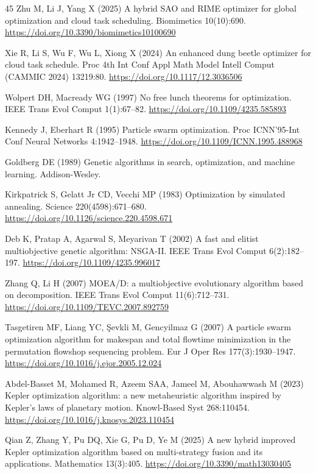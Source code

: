 \documentclass[pdflatex,onecolumn,sn-mathphys-num]{sn-jnl}
\begin{document}
\begin{thebibliography}{45}
Zhu M, Li J, Yang X (2025) A hybrid SAO and RIME optimizer for global optimization and cloud task scheduling. Biomimetics 10(10):690. \url{https://doi.org/10.3390/biomimetics10100690}

Xie R, Li S, Wu F, Wu L, Xiong X (2024) An enhanced dung beetle optimizer for cloud task schedule. Proc 4th Int Conf Appl Math Model Intell Comput (CAMMIC 2024) 13219:80. \url{https://doi.org/10.1117/12.3036506}

Wolpert DH, Macready WG (1997) No free lunch theorems for optimization. IEEE Trans Evol Comput 1(1):67--82. \url{https://doi.org/10.1109/4235.585893}

Kennedy J, Eberhart R (1995) Particle swarm optimization. Proc ICNN'95-Int Conf Neural Networks 4:1942--1948. \url{https://doi.org/10.1109/ICNN.1995.488968}

Goldberg DE (1989) Genetic algorithms in search, optimization, and machine learning. Addison-Wesley.

Kirkpatrick S, Gelatt Jr CD, Vecchi MP (1983) Optimization by simulated annealing. Science 220(4598):671--680. \url{https://doi.org/10.1126/science.220.4598.671}

Deb K, Pratap A, Agarwal S, Meyarivan T (2002) A fast and elitist multiobjective genetic algorithm: NSGA-II. IEEE Trans Evol Comput 6(2):182--197. \url{https://doi.org/10.1109/4235.996017}

Zhang Q, Li H (2007) MOEA/D: a multiobjective evolutionary algorithm based on decomposition. IEEE Trans Evol Comput 11(6):712--731. \url{https://doi.org/10.1109/TEVC.2007.892759}

Tasgetiren MF, Liang YC, \c{S}evkli M, Gencyilmaz G (2007) A particle swarm optimization algorithm for makespan and total flowtime minimization in the permutation flowshop sequencing problem. Eur J Oper Res 177(3):1930--1947. \url{https://doi.org/10.1016/j.ejor.2005.12.024}

Abdel-Basset M, Mohamed R, Azeem SAA, Jameel M, Abouhawwash M (2023) Kepler optimization algorithm: a new metaheuristic algorithm inspired by Kepler's laws of planetary motion. Knowl-Based Syst 268:110454. \url{https://doi.org/10.1016/j.knosys.2023.110454}

Qian Z, Zhang Y, Pu DQ, Xie G, Pu D, Ye M (2025) A new hybrid improved Kepler optimization algorithm based on multi-strategy fusion and its applications. Mathematics 13(3):405. \url{https://doi.org/10.3390/math13030405}


\end{thebibliography}
\end{document}
